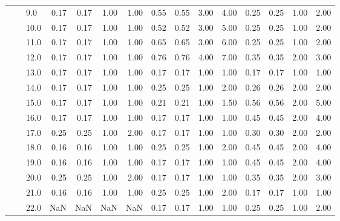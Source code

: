 \begin{tabular}{lllrrrrrrrrrrrr}
       &     & 9.0  &       0.17 &      0.17 & 1.00 &   1.00 &       0.55 &      0.55 &  3.00 &   4.00 &       0.25 &      0.25 &  1.00 &   2.00 \\
       &     & 10.0 &       0.17 &      0.17 & 1.00 &   1.00 &       0.52 &      0.52 &  3.00 &   5.00 &       0.25 &      0.25 &  1.00 &   2.00 \\
       &     & 11.0 &       0.17 &      0.17 & 1.00 &   1.00 &       0.65 &      0.65 &  3.00 &   6.00 &       0.25 &      0.25 &  1.00 &   2.00 \\
       &     & 12.0 &       0.17 &      0.17 & 1.00 &   1.00 &       0.76 &      0.76 &  4.00 &   7.00 &       0.35 &      0.35 &  2.00 &   3.00 \\
       &     & 13.0 &       0.17 &      0.17 & 1.00 &   1.00 &       0.17 &      0.17 &  1.00 &   1.00 &       0.17 &      0.17 &  1.00 &   1.00 \\
       &     & 14.0 &       0.17 &      0.17 & 1.00 &   1.00 &       0.25 &      0.25 &  1.00 &   2.00 &       0.26 &      0.26 &  2.00 &   2.00 \\
       &     & 15.0 &       0.17 &      0.17 & 1.00 &   1.00 &       0.21 &      0.21 &  1.00 &   1.50 &       0.56 &      0.56 &  2.00 &   5.00 \\
       &     & 16.0 &       0.17 &      0.17 & 1.00 &   1.00 &       0.17 &      0.17 &  1.00 &   1.00 &       0.45 &      0.45 &  2.00 &   4.00 \\
       &     & 17.0 &       0.25 &      0.25 & 1.00 &   2.00 &       0.17 &      0.17 &  1.00 &   1.00 &       0.30 &      0.30 &  2.00 &   2.00 \\
       &     & 18.0 &       0.16 &      0.16 & 1.00 &   1.00 &       0.25 &      0.25 &  1.00 &   2.00 &       0.45 &      0.45 &  2.00 &   4.00 \\
       &     & 19.0 &       0.16 &      0.16 & 1.00 &   1.00 &       0.17 &      0.17 &  1.00 &   1.00 &       0.45 &      0.45 &  2.00 &   4.00 \\
       &     & 20.0 &       0.25 &      0.25 & 1.00 &   2.00 &       0.17 &      0.17 &  1.00 &   1.00 &       0.35 &      0.35 &  2.00 &   3.00 \\
       &     & 21.0 &       0.16 &      0.16 & 1.00 &   1.00 &       0.25 &      0.25 &  1.00 &   2.00 &       0.17 &      0.17 &  1.00 &   1.00 \\
       &     & 22.0 &        NaN &       NaN &  NaN &    NaN &       0.17 &      0.17 &  1.00 &   1.00 &       0.25 &      0.25 &  1.00 &   2.00 \\

\end{tabular}
